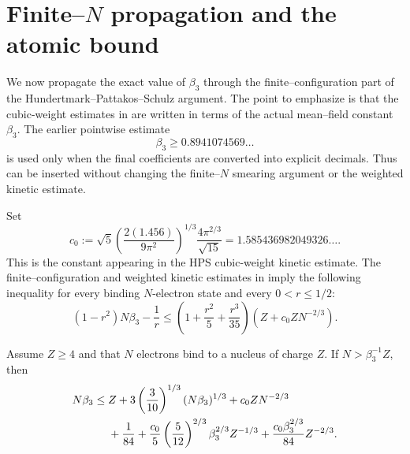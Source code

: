 \section{Finite--$N$ propagation and the atomic bound}\label{sec:atomic}

We now propagate the exact value of $\beta_3$ through the finite--configuration part of the Hundertmark--Pattakos--Schulz argument.  The point to emphasize is that the cubic-weight estimates in \cite[Section 7.3]{HPS2025} are written in terms of the actual mean--field constant $\beta_3$.  The earlier pointwise estimate
\[
 \beta_3\ge0.8941074569\ldots
\]
is used only when the final coefficients are converted into explicit decimals.  Thus  can be inserted without changing the finite--$N$ smearing argument or the weighted kinetic estimate.

Set
\[
 c_0:=
 \sqrt5\left(\frac{2(1.456)}{9\pi^2}\right)^{1/3}
 \frac{4\pi^{2/3}}{\sqrt{15}}
 =1.585436982049326\ldots .
\]
This is the constant appearing in the HPS cubic-weight kinetic estimate.  The finite--configuration and weighted kinetic estimates in \cite[Sec.~7.3]{HPS2025} imply the following inequality for every binding $N$-electron state and every $0<r\le1/2$:
\begin{equation}\label{eq:hps-transfer}
 (1-r^2)N\beta_3-\frac1r
 \le
 \left(1+\frac{r^2}{5}+\frac{r^3}{35}\right)
 \left(Z+c_0ZN^{-2/3}\right).
\end{equation}

\begin{proposition}\label{prop:finite-N}
Assume $Z\ge4$ and that $N$ electrons bind to a nucleus of charge $Z$.  If $N>\beta_3^{-1}Z$, then
\begin{align}
N\beta_3\le{}&
 Z+3\left(\frac3{10}\right)^{1/3}(N\beta_3)^{1/3}
 +c_0ZN^{-2/3} \notag\\
&+\frac1{84}
 +\frac{c_0}{5}\left(\frac5{12}\right)^{2/3}
   \beta_3^{2/3}Z^{-1/3}
 +\frac{c_0\beta_3^{2/3}}{84}Z^{-2/3}.
\label{eq:finite-N-reoptimized}
\end{align}
\end{proposition}

